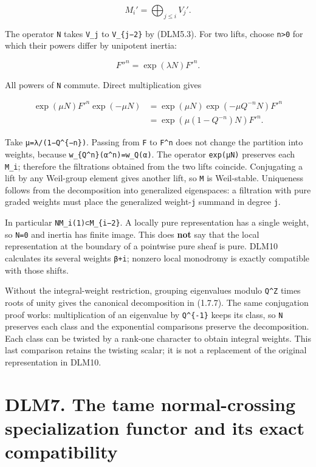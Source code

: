 \documentclass[
]{report}
\begin{document}
\[
M_i'=\bigoplus_{j\le i}V_j'.
\tag{DLM6.1}
\]

The operator \texttt{N} takes \texttt{V\_j\textquotesingle{}} to
\texttt{V\_\{j−2\}\textquotesingle{}} by (DLM5.3). For two lifts, choose
\texttt{n\textgreater{}0} for which their powers differ by unipotent
inertia:

\[
F''^n=\exp(\lambda N)F'^n.
\]

All powers of \texttt{N} commute. Direct multiplication gives

\[
\begin{aligned}
\exp(\mu N)F'^n\exp(-\mu N)
&=\exp(\mu N)\exp(-\mu Q^{-n}N)F'^n\\
&=\exp(\mu(1-Q^{-n})N)F'^n.
\end{aligned}
\tag{DLM6.2}
\]

Take \texttt{μ=λ/(1−Q\^{}\{−n\})}. Passing from
\texttt{F\textquotesingle{}} to \texttt{F\textquotesingle{}\^{}n} does
not change the partition into weights, because
\texttt{w\_\{Q\^{}n\}(α\^{}n)=w\_Q(α)}. The operator \texttt{exp(μN)}
preserves each \texttt{M\_i\textquotesingle{}}; therefore the
filtrations obtained from the two lifts coincide. Conjugating a lift by
any Weil-group element gives another lift, so \texttt{M} is Weil-stable.
Uniqueness follows from the decomposition into generalized eigenspaces:
a filtration with pure graded weights must place the generalized
weight-\texttt{j} summand in degree \texttt{j}.

In particular \texttt{NM\_i(1)⊂M\_\{i−2\}}. A locally pure
representation has a single weight, so \texttt{N=0} and inertia has
finite image. This does \textbf{not} say that the local representation
at the boundary of a pointwise pure sheaf is pure. DLM10 calculates its
several weights \texttt{β+i}; nonzero local monodromy is exactly
compatible with those shifts.

Without the integral-weight restriction, grouping eigenvalues modulo
\texttt{Q\^{}Z} times roots of unity gives the canonical decomposition
in (1.7.7). The same conjugation proof works: multiplication of an
eigenvalue by \texttt{Q\^{}\{-1\}} keeps its class, so \texttt{N}
preserves each class and the exponential comparisons preserve the
decomposition. Each class can be twisted by a rank-one character to
obtain integral weights. This last comparison retains the twisting
scalar; it is not a replacement of the original representation in DLM10.

\section{DLM7. The tame normal-crossing specialization functor and its
exact
compatibility}\label{dlm7.-the-tame-normal-crossing-specialization-functor-and-its-exact-compatibility}
\end{document}
